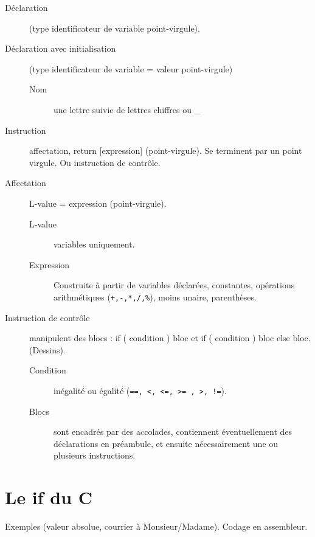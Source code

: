 \documentclass[12pt,a4paper]{article}
\begin{document}
\begin{description}
\item[Déclaration] (type identificateur de variable point-virgule).
\item[Déclaration avec initialisation] (type identificateur de variable = valeur
  point-virgule)
  \begin{description}
  \item[Nom] une lettre suivie de lettres chiffres ou \_
  \end{description}

\item[Instruction] affectation, return [expression]
  (point-virgule). Se terminent par un point virgule. Ou instruction
  de contrôle.

\item[Affectation] L-value = expression (point-virgule). 

  \begin{description}
  \item[L-value] variables uniquement.

  \item[Expression] Construite à partir de variables déclarées,
    constantes, opérations arithmétiques (\verb|+,-,*,/,%|), moins
    unaire, parenthèses.
  \end{description}

\item[Instruction de contrôle] manipulent des blocs : if
 ( condition ) bloc et if ( condition ) bloc else bloc. (Dessins).

\begin{description}
\item[Condition] inégalité ou égalité (\verb|==, <, <=, >= , >, !=|).

\item[Blocs] sont encadrés par des accolades, contiennent éventuellement
des déclarations en préambule, et ensuite nécessairement une ou
plusieurs instructions.
\end{description}

\end{description}

\section{Le if du C}

Exemples (valeur absolue, courrier à Monsieur/Madame). Codage en
assembleur.
\end{document}
